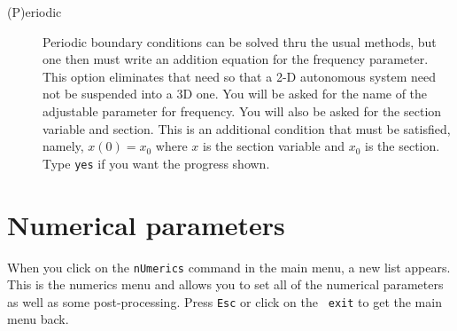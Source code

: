 \documentclass{article}
\begin{document}
\begin{description}
\begin{description}
\item[(P)eriodic] Periodic boundary conditions can be solved thru the
usual methods, but one then must write an addition equation for the
frequency parameter.  This option eliminates that need so that a 2-D
autonomous system need not be suspended into a 3D one.  You will be
asked for the name of the adjustable parameter for frequency.  You
will also be asked for the section variable and section.  This is an additional
condition that must be satisfied, namely, $x(0)=x_0$ where $x$ is the
section variable and $x_0$ is the section.  Type {\tt yes} if you want
the progress shown.  
\end{description}
\end{description}


\section{Numerical parameters}
When you click on the {\tt nUmerics} command in the main menu, a new
list appears.  This is the numerics menu and allows you to set all of
the numerical parameters as well as some post-processing.  Press {\tt Esc} or click on the {\tt
exit} to get the main menu back.
\end{document}
